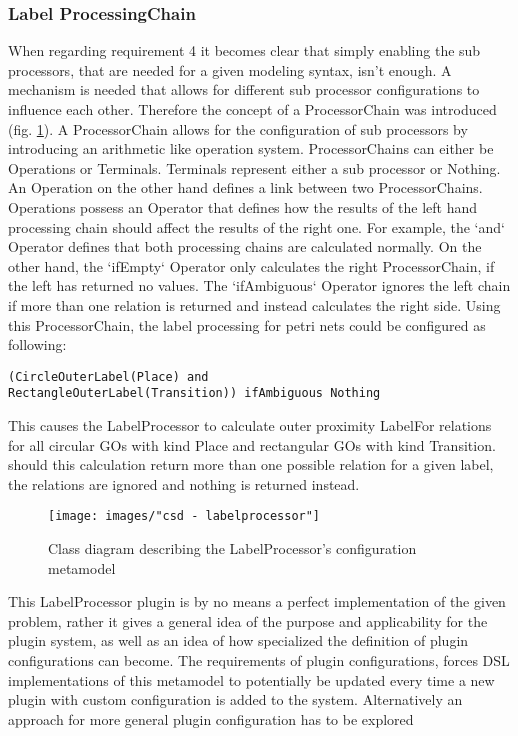 \subsubsection{Label ProcessingChain}
When regarding requirement 4 it becomes clear that simply enabling the sub processors, that are needed for a given modeling syntax, isn't enough. A mechanism is needed that allows for different sub processor configurations to influence each other. Therefore the concept of a ProcessorChain was introduced (fig. \ref{fig:labelprocessor-config}). A ProcessorChain allows for the configuration of sub processors by introducing an arithmetic like operation system. ProcessorChains can either be Operations or Terminals. Terminals represent either a sub processor or Nothing. An Operation on the other hand defines a link between two ProcessorChains. Operations possess an Operator that defines how the results of the left hand processing chain should affect the results of the right one. For example, the `and` Operator defines that both processing chains are calculated normally. On the other hand, the `ifEmpty` Operator only calculates the right ProcessorChain, if the left has returned no values. The `ifAmbiguous` Operator ignores the left chain if more than one relation is returned and instead calculates the right side. Using this ProcessorChain, the label processing for petri nets could be configured as following: 
\begin{lstlisting}
(CircleOuterLabel(Place) and 
RectangleOuterLabel(Transition)) ifAmbiguous Nothing
\end{lstlisting}
This causes the LabelProcessor to calculate outer proximity LabelFor relations for all circular GOs with kind Place and rectangular GOs with kind Transition. should this calculation return more than one possible relation for a given label, the relations are ignored and nothing is returned instead.

\begin{figure}[ht]
\centering
\texttt{[image: images/"csd - labelprocessor"]}
\caption{Class diagram describing the LabelProcessor's configuration metamodel}
\label{fig:labelprocessor-config}
\end{figure}

This LabelProcessor plugin is by no means a perfect implementation of the given problem, rather it gives a general idea of the purpose and applicability for the plugin system, as well as an idea of how specialized the definition of plugin configurations can become. The requirements of plugin configurations, forces DSL implementations of this metamodel to potentially be updated every time a new plugin with custom configuration is added to the system. Alternatively an approach for more general plugin configuration has to be explored


